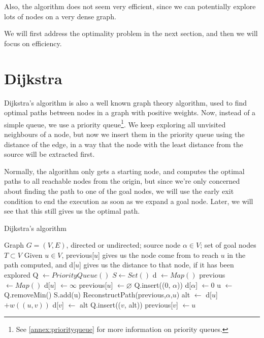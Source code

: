 \documentclass[a4paper,10pt]{report}
\begin{document}
Also, the algorithm does not seem very efficient, since we can potentially explore lots of nodes on a very dense graph.

We will first address the optimality problem in the next section, and then we will focus on efficiency.


\section{Dijkstra}
Dijkstra's algorithm \cite{dijkstra} is also a well known graph theory algorithm, used to find optimal paths between nodes in a graph with positive weights. Now, instead of a simple queue, we use a priority queue\footnote{See \ref{annex:priorityqueue} for more information on priority queues.}. We keep exploring all unvisited neighbours of a node, but now we insert them in the priority queue using the distance of the edge, in a way that the node with the least distance from the source will be extracted first.

Normally, the algorithm only gets a starting node, and computes the optimal paths to all reachable nodes from the origin, but since we're only concerned about finding the path to one of the goal nodes, we will use the early exit condition to end the execution as soon as we expand a goal node. Later, we will see that this still gives us the optimal path.

\begin{algorithm}
\caption{Dijkstra's algorithm}
\label{alg:dijkstra}
\begin{algorithmic}[1]
\Require Graph $G = (V, E)$, directed or undirected; source node $\alpha \in V$; set of goal nodes $T \subset V$
\Ensure Given $u \in V$, previous[$u$] gives us the node come from to reach $u$ in the path computed, and d[$u$] gives us the distance to that node, if it has been explored
\State Q $\gets PriorityQueue()$
\State $S \gets Set()$
\State d $\gets Map()$ 
\State previous $\gets Map()$
	\State d[$u$] $\gets \infty$
	\State previous[$u$] $\gets \varnothing$
\EndFor
\State Q.insert((0, $\alpha$))
\State d[$\alpha$] $\gets 0$
	\State u $\gets$ Q.removeMin()
	\State S.add(u)
	 
		\State \Return ReconstructPath(previous,$\alpha$,$u$)
	\EndIf
			\Continue {}
		\EndIf
		\State alt $\gets$ d[$u$] $+ w((u, v))$
			\State d[$v$] $\gets$ alt
			\State Q.insert(($v$, alt))
			\State previous[$v$] $\gets u$
		\EndIf
	\EndFor
\EndWhile
\EndProcedure
\end{algorithmic}
\end{algorithm}
\end{document}
